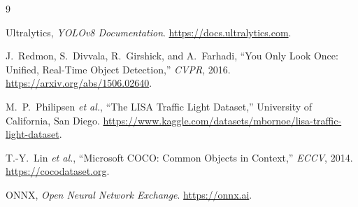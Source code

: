 \begin{thebibliography}{9}
Ultralytics, \emph{YOLOv8 Documentation}.
\url{https://docs.ultralytics.com}.

J.~Redmon, S.~Divvala, R.~Girshick, and A.~Farhadi,
``You Only Look Once: Unified, Real-Time Object Detection,''
\emph{CVPR}, 2016. \url{https://arxiv.org/abs/1506.02640}.

M.~P.~Philipsen \emph{et al.}, ``The LISA Traffic Light Dataset,''
University of California, San Diego.
\url{https://www.kaggle.com/datasets/mbornoe/lisa-traffic-light-dataset}.

T.-Y.~Lin \emph{et al.}, ``Microsoft COCO: Common Objects in Context,''
\emph{ECCV}, 2014. \url{https://cocodataset.org}.

ONNX, \emph{Open Neural Network Exchange}. \url{https://onnx.ai}.
\end{thebibliography}


